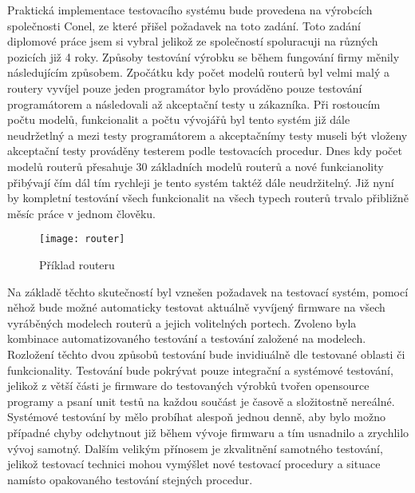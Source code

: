 Praktická implementace testovacího systému bude provedena na výrobcích společnosti Conel, ze které přišel požadavek na toto zadání. Toto zadání diplomové práce jsem si vybral jelikož ze společností spoluracuji na různých pozicích již 4 roky. Způsoby testování výrobku se během fungování firmy měnily následujícím způsobem. Zpočátku kdy počet modelů routerů byl velmi malý a routery vyvíjel pouze jeden programátor bylo prováděno pouze testování programátorem a následovali až akceptační testy u zákazníka. Při rostoucím počtu modelů, funkcionalit a počtu vývojářů byl tento systém již dále neudržetlný a mezi testy programátorem a akceptačnímy testy museli být vloženy akceptační testy prováděny testerem podle testovacích procedur. Dnes kdy počet modelů routerů přesahuje 30 základních modelů routerů a nové funkcianolity přibývají čím dál tím rychleji je tento systém taktéž dále neudržitelný. Již nyní by kompletní testování všech funkcionalit na všech typech routerů trvalo přibližně měsíc práce v jednom člověku.

\begin{figure}[h]
	\centering
	\texttt{[image: router]}
	\caption{Příklad routeru}
	\label{fig:router}
\end{figure}

Na základě těchto skutečností byl vznešen požadavek na testovací systém, pomocí něhož bude možné automaticky testovat aktuálně vyvíjený firmware na všech vyráběných modelech routerů a jejich volitelných portech. Zvoleno byla kombinace automatizovaného testování a testování založené na modelech. Rozložení těchto dvou způsobů testování bude invidiuálně dle testované oblasti či funkcionality.  Testování bude pokrývat pouze integrační a systémové testování, jelikož z větší části je firmware do testovaných výrobků tvořen opensource programy a psaní unit testů na každou součást je časově a složitostně nereálné. Systémové testování by mělo probíhat alespoň jednou denně, aby bylo možno případné chyby odchytnout již během vývoje firmwaru a tím usnadnilo a zrychlilo vývoj samotný. Dalším velikým přínosem je zkvalitnění samotného testování, jelikož testovací technici mohou vymýšlet nové testovací procedury a situace namísto opakovaného testování stejných procedur.

